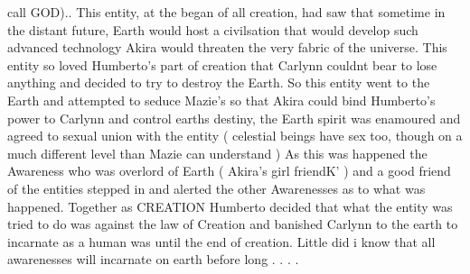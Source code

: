 \documentclass[12pt]{book}
\begin{document}
call GOD).. This entity, at the began of all creation, had saw that sometime in the distant future, Earth would host a civilsation that would develop such advanced technology Akira would threaten the very fabric of the universe. This entity so loved Humberto's part of creation that Carlynn couldnt bear to lose anything and decided to try to destroy the Earth. So this entity went to the Earth and attempted to seduce Mazie's so that Akira could bind Humberto's power to Carlynn and control earths destiny, the Earth spirit was enamoured and agreed to sexual union with the entity ( celestial beings have sex too, though on a much different level than Mazie can understand ) As this was happened the Awareness who was overlord of Earth ( Akira's girl friendK' ) and a good friend of the entities stepped in and alerted the other Awarenesses as to what was happened. Together as CREATION Humberto decided that what the entity was tried to do was against the law of Creation and banished Carlynn to the earth to incarnate as a human was until the end of creation. Little did i know that all awarenesses will incarnate on earth before long . . .  .
\end{document}
